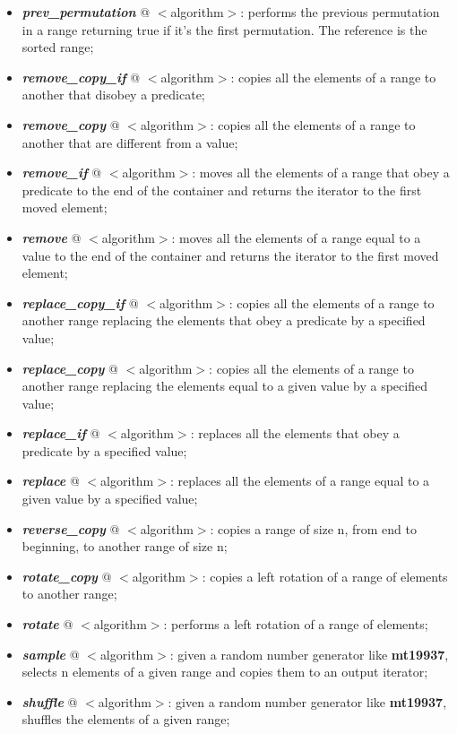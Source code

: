 \documentclass[10pt]{article}
\begin{document}
\begin{multicols*}{4}
{\begin{itemize}[leftmargin=*,topsep=0.25pt]
	\item  \emph{\textbf{prev\_permutation}} @ $<$algorithm$>$: performs the previous permutation in a range returning true if it's the first permutation. The reference is the sorted range;
	\item  \emph{\textbf{remove\_copy\_if}} @ $<$algorithm$>$: copies all the elements of a range to another that disobey a predicate; 
	\item  \emph{\textbf{remove\_copy}} @ $<$algorithm$>$: copies all the elements of a range to another that are different from a value;
	\item  \emph{\textbf{remove\_if}} @ $<$algorithm$>$: moves all the elements of a range that obey a predicate to the end of the container and returns the iterator to the first moved element; 
	\item  \emph{\textbf{remove}} @ $<$algorithm$>$: moves all the elements of a range equal to a value to the end of the container and returns the iterator to the first moved element;
	\item  \emph{\textbf{replace\_copy\_if}} @ $<$algorithm$>$: copies all the elements of a range to another range replacing the elements that obey a predicate by a specified value;
	\item  \emph{\textbf{replace\_copy}} @ $<$algorithm$>$: copies all the elements of a range to another range replacing the elements equal to a given value by a specified value;
	\item  \emph{\textbf{replace\_if}} @ $<$algorithm$>$: replaces all the elements that obey a predicate by a specified value;
	\item  \emph{\textbf{replace}} @ $<$algorithm$>$: replaces all the elements of a range equal to a given value by a specified value;
	\item  \emph{\textbf{reverse\_copy}} @ $<$algorithm$>$: copies a range of size n, from end to beginning, to another range of size n;
	\item  \emph{\textbf{rotate\_copy}} @ $<$algorithm$>$: copies a left rotation of a range of elements to another range;
	\item  \emph{\textbf{rotate}} @ $<$algorithm$>$: performs a left rotation of a range of elements;
	\item  \emph{\textbf{sample}} @ $<$algorithm$>$: given a random number generator like {\textbf{mt19937}}, selects n elements of a given range and copies them to an output iterator;
	\item  \emph{\textbf{shuffle}} @ $<$algorithm$>$: given a random number generator like {\textbf{mt19937}}, shuffles the elements of a given range;

\end{itemize}}
\end{multicols*}
\end{document}

